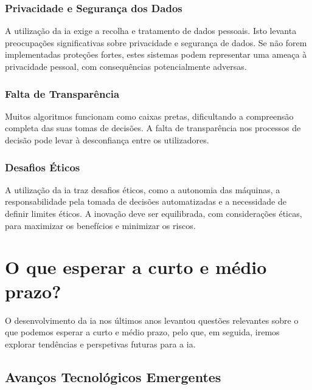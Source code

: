\documentclass{report}
\begin{document}
\subsubsection{Privacidade e Segurança dos Dados}
\label{subsubsec.privacidade}

	A utilização da \ac{ia} exige a recolha e tratamento de dados pessoais. Isto levanta preocupações significativas sobre privacidade e segurança de dados. Se não forem implementadas proteções fortes, estes sistemas podem representar
uma ameaça à privacidade pessoal, com consequências potencialmente adversas.

\subsubsection{Falta de Transparência}
\label{subsubsec.transparencia}

	Muitos algoritmos funcionam como caixas pretas, dificultando a compreensão completa das suas tomas de decisões. A falta de transparência nos processos de decisão pode levar à desconfiança entre os utilizadores. \cite{transparencia}

\subsubsection{Desafios Éticos}
\label{subsubsec.etica}

	A utilização da \ac{ia} traz desafios éticos, como a autonomia das máquinas, a responsabilidade pela tomada de decisões automatizadas e a necessidade de definir limites éticos. A inovação deve ser equilibrada, com considerações éticas, para maximizar os benefícios e minimizar os riscos. \cite{desafios1} \cite{desafios2}

\section{O que esperar a curto e médio prazo?}
\label{sec.o que esperar}

	O desenvolvimento da \ac{ia} nos últimos anos levantou questões relevantes sobre o que podemos esperar a curto e médio prazo, pelo que, em seguida, iremos explorar tendências e perspetivas futuras para a \ac{ia}. \cite{prazo1} \cite{prazo2}

\subsection{Avanços Tecnológicos Emergentes}
\label{subsec.avançostecno}
\end{document}
